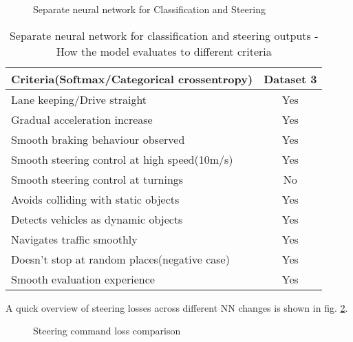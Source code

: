 \begin{figure}[!ht]
	\centering
    \def\svgwidth{\textwidth}
    \caption{Separate neural network for Classification and Steering}
    \label{fig:ds3categoricalcrossentropy2nn}
\end{figure}
\begin{table}[!ht]
    \centering
\begin{tabular}{lc}
    \toprule
    Criteria(Softmax/Categorical crossentropy)  & Dataset 3 \\\midrule
    Lane keeping/Drive straight  & Yes  \\
    Gradual acceleration increase  & Yes\\
    Smooth braking behaviour observed & Yes \\
    Smooth steering control at high speed(10m/s) & Yes \\
    Smooth steering control at turnings & No\\
    Avoids colliding with static objects & Yes \\
    Detects vehicles as dynamic objects & Yes \\
    Navigates traffic smoothly & Yes\\
    Doesn't stop at random places(negative case) & Yes \\
    Smooth evaluation experience & Yes \\\bottomrule
\end{tabular}
\caption{Separate neural network for classification and steering outputs - How the model evaluates to different criteria}
\label{table:cce2NN}
\end{table}

A quick overview of steering losses across different NN changes is shown in fig. \ref{fig:ds3categoricalcrossentropysteeringcompare}.
 \begin{figure}[!ht]
	\centering
    \def\svgwidth{0.9\textwidth}
    \caption{Steering command loss comparison}
    \label{fig:ds3categoricalcrossentropysteeringcompare}
\end{figure}

